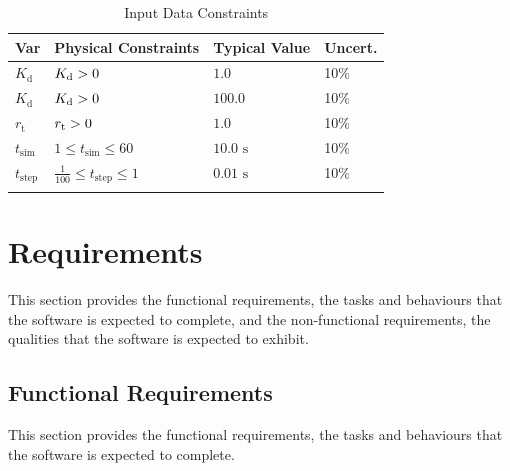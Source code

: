 \documentclass[12pt]{article}
\newcommand{\gt}{\ensuremath >}
\begin{document}
\begin{longtable}{l l l l}
\toprule
\textbf{Var} & \textbf{Physical Constraints} & \textbf{Typical Value} & \textbf{Uncert.}
\\
\midrule
\endhead
${K_{\text{d}}}$ & ${K_{\text{d}}}\gt{}0$ & $1.0$ & 10$\%$
\\
${K_{\text{d}}}$ & ${K_{\text{d}}}\gt{}0$ & $100.0$ & 10$\%$
\\
${r_{\text{t}}}$ & ${r_{\text{t}}}\gt{}0$ & $1.0$ & 10$\%$
\\
${t_{\text{sim}}}$ & $1\leq{}{t_{\text{sim}}}\leq{}60$ & $10.0$ ${\text{s}}$ & 10$\%$
\\
${t_{\text{step}}}$ & $\frac{1}{100}\leq{}{t_{\text{step}}}\leq{}1$ & $0.01$ ${\text{s}}$ & 10$\%$
\\
\bottomrule
\caption{Input Data Constraints}
\label{Table:InDataConstraints}
\end{longtable}
\section{Requirements}
\label{Sec:Requirements}
This section provides the functional requirements, the tasks and behaviours that the software is expected to complete, and the non-functional requirements, the qualities that the software is expected to exhibit.

\subsection{Functional Requirements}
\label{Sec:FRs}
This section provides the functional requirements, the tasks and behaviours that the software is expected to complete.
\end{document}
